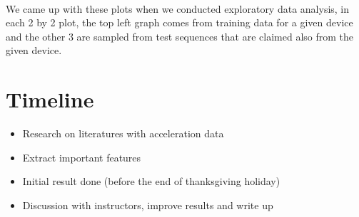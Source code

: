 \documentclass{article}
\begin{document}
	\paragraph{} We came up with these plots when we conducted exploratory data analysis, in each 2 by 2 plot, the top left graph comes from training data for a given device and the other 3 are sampled from test sequences that are claimed also from the given device.




	\section{Timeline} %
	\label{sec:timeline}
	\begin{itemize}
		\item Research on literatures with acceleration data
		\item Extract important features 
		\item Initial result done (before the end of thanksgiving holiday)
		\item Discussion with instructors, improve results and write up
	\end{itemize}
	
	
\end{document}
